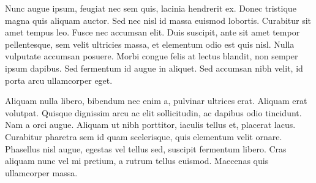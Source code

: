 \documentclass[aps,prc,reprint,amsmath,nofootinbib]{revtex4-1}
\begin{document}
Nunc augue ipsum, feugiat nec sem quis, lacinia hendrerit ex. Donec tristique magna quis aliquam auctor. Sed nec nisl id massa euismod lobortis. Curabitur sit amet tempus leo. Fusce nec accumsan elit. Duis suscipit, ante sit amet tempor pellentesque, sem velit ultricies massa, et elementum odio est quis nisl. Nulla vulputate accumsan posuere. Morbi congue felis at lectus blandit, non semper ipsum dapibus. Sed fermentum id augue in aliquet. Sed accumsan nibh velit, id porta arcu ullamcorper eget.

Aliquam nulla libero, bibendum nec enim a, pulvinar ultrices erat. Aliquam erat volutpat. Quisque dignissim arcu ac elit sollicitudin, ac dapibus odio tincidunt. Nam a orci augue. Aliquam ut nibh porttitor, iaculis tellus et, placerat lacus. Curabitur pharetra sem id quam scelerisque, quis elementum velit ornare. Phasellus nisl augue, egestas vel tellus sed, suscipit fermentum libero. Cras aliquam nunc vel mi pretium, a rutrum tellus euismod. Maecenas quis ullamcorper massa. 
%
\end{document}

